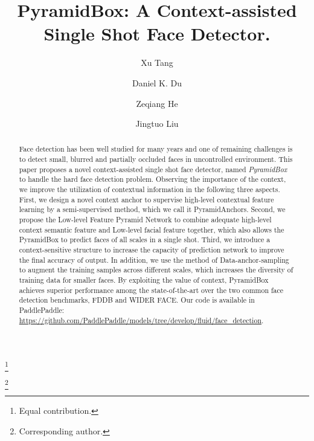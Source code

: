 \documentclass[runningheads]{llncs}
\begin{document}
\newcommand\blfootnote[1]{\begingroup
  \renewcommand\thefootnote{}\footnote{#1}\addtocounter{footnote}{-1}\endgroup
}

\title{PyramidBox: A Context-assisted Single Shot Face Detector.} 





\author{Xu Tang \and Daniel K. Du \and Zeqiang He \and
Jingtuo Liu}





\maketitle              

\blfootnote{ Equal contribution.}
\blfootnote{ Corresponding author.}




\begin{abstract}
Face detection has been well studied for many years and one of remaining
challenges is to detect small, blurred and partially occluded faces in uncontrolled
environment. This paper proposes a novel context-assisted single shot face detector,
named \emph{PyramidBox} to handle the hard face detection problem.
Observing the importance of the context, we improve the utilization of contextual information in the following three aspects.
First, we design a novel context anchor to supervise high-level contextual feature learning by a semi-supervised method, which we call it PyramidAnchors.
Second, we propose the Low-level Feature Pyramid Network to combine adequate high-level context semantic feature and Low-level facial feature together, which also allows the PyramidBox to predict faces of all scales in a single shot.
Third, we introduce a context-sensitive structure to increase the capacity of prediction network to improve the final accuracy of output.
In addition, we use the method of Data-anchor-sampling to augment the training samples across different scales, which increases the diversity of training data for smaller faces.
By exploiting the value of context, PyramidBox achieves superior performance among the state-of-the-art over the two common face detection benchmarks, FDDB and WIDER FACE. Our code is available in PaddlePaddle: \href{https://github.com/PaddlePaddle/models/tree/develop/fluid/face_detection}{\url{https://github.com/PaddlePaddle/models/tree/develop/fluid/face_detection}}.
\end{abstract}
\end{document}
